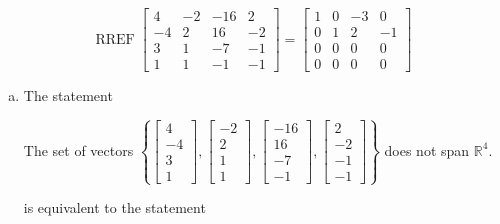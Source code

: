 \begin{exerciseAnswer} 


\[\operatorname{RREF} \left[\begin{array}{cccc}
4 & -2 & -16 & 2 \\
-4 & 2 & 16 & -2 \\
3 & 1 & -7 & -1 \\
1 & 1 & -1 & -1
\end{array}\right] = \left[\begin{array}{cccc}
1 & 0 & -3 & 0 \\
0 & 1 & 2 & -1 \\
0 & 0 & 0 & 0 \\
0 & 0 & 0 & 0
\end{array}\right] \]


\begin{enumerate}[(a)]
\item The statement 
\begin{center}\begin{minipage}{0.8\textwidth}
 The set of vectors \( \left\{ \left[\begin{array}{c}
4 \\
-4 \\
3 \\
1
\end{array}\right] , \left[\begin{array}{c}
-2 \\
2 \\
1 \\
1
\end{array}\right] , \left[\begin{array}{c}
-16 \\
16 \\
-7 \\
-1
\end{array}\right] , \left[\begin{array}{c}
2 \\
-2 \\
-1 \\
-1
\end{array}\right] \right\} \) does not span \(\mathbb{R}^4\). 
\end{minipage}\end{center}
     is equivalent to the statement 
\begin{center}\begin{minipage}{0.8\textwidth}
 The vector equation \( x_{1} \left[\begin{array}{c}
4 \\
-4 \\

\end{array}
\end{minipage}
\end{center}
\end{enumerate}
\end{exerciseAnswer}
